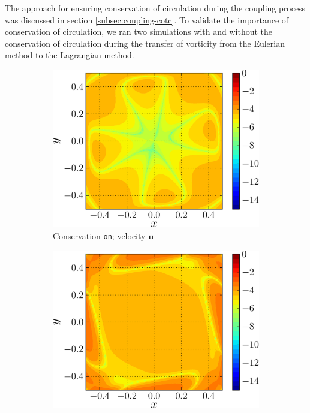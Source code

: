 The approach for ensuring conservation of circulation during the coupling process was discussed in section 	\ref{subsec:coupling-cotc}. To validate the importance of conservation of circulation, we ran two simulations with and without the conservation of circulation during the transfer of vorticity from the Eulerian method to the Lagrangian method. %

	\begin{figure}[!b]
     \centering
     \begin{subfigure}[t]{0.45\textwidth}
             \includegraphics[width=\linewidth]{./figures/validation/lambOseent2/lambOseen_fully_vErrorFinal_compressed-crop.png}
             \caption{Conservation \texttt{on}; velocity $\mathbf{u}$}
             \label{fig:lambOseen_fullyCon_vErrorFinal}
     \end{subfigure}%
     \qquad %
    \begin{subfigure}[t]{0.45\textwidth}
             \includegraphics[width=\linewidth]{./figures/validation/lambOseent2/lambOseen_fully_wErrorFinal_compressed-crop.png}

\end{subfigure}
\end{figure}
